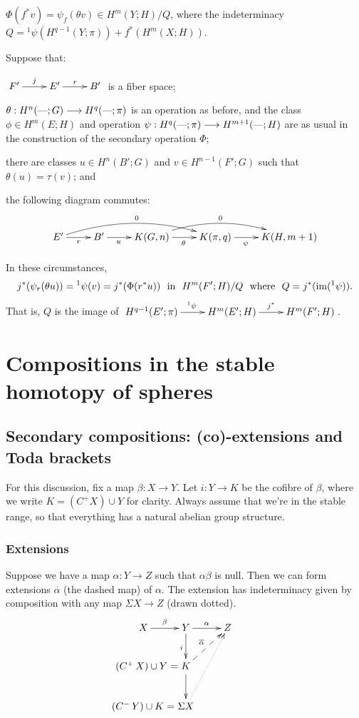 \documentclass[11pt]{article}
\begin{document}
\begin{thm*}
$\Phi(f^*v)=\psi_f(\theta v)\in H^m(Y;H)/Q$, where the indeterminacy 
$Q={^1\psi}(H^{q-1}(Y;\pi))+f^*(H^m(X;H))$.
\end{thm*}
Suppose that:
\begin{itemise}
\item $\xymatrix{F'\ar[r]^j&E'\ar[r]^r&B'}$ is a fiber space;
\item $\theta:H^n(\textup{---};G)\longrightarrow H^q(\textup{---};\pi)$ is an operation as before, and the
class $\phi\in H^m(E;H)$ and operation $\psi:H^q(\textup{---};\pi)\longrightarrow H^{m+1}(\textup{---};H)$
are as usual in the construction of the secondary operation $\Phi$;
\item there are classes $u\in H^n(B';G)$ and $v\in H^{n-1}(F';G)$ such that
$\theta(u)=\tau(v)$; and
\item the following diagram commutes:
\[\xymatrix{
E'\ar[r]_r\ar@/^1.2pc/[rrr]^0&
B'\ar[r]_{\ \ u\qquad}&
K(G,n)\ar[r]_\theta\ar@/^1.2pc/[rr]^0&
K(\pi,q)\ar[r]_{\psi\ \ \ \ }&
K(H,m+1)
}\]
\end{itemise}
\begin{thm*}In these circumstances,
\[j^*(\psi_r(\theta u))={^1\psi}(v)=j^*(\Phi(r^*u))\text{ \ in \ }
H^m(F';H)/Q\text{ \ where \ }Q=j^*(\operatorname{im}({^1\psi})).\]
That is, $Q$ is the image of 
$\xymatrix{H^{q-1}(E';\pi)\ar[r]^{^1\psi}&H^m(E';H)\ar[r]^{j^*}&H^m(F';H)}.$
\end{thm*}
\section{Compositions in the stable homotopy of spheres}
\subsection{Secondary compositions: (co)-extensions and Toda brackets}
For this discussion, fix a map $\beta:X\to Y$. Let $i:Y\to K$ be the cofibre of
$\beta$, where we write $K=(C^+\!X)\cup Y$ for clarity. Always assume that we're
in the stable range, so that everything has a natural abelian group structure.
\subsubsection*{Extensions}
Suppose we have a map $\alpha:Y\to Z$ such that $\alpha\beta$ is null. Then we
can form extensions $\overline\alpha$ (the dashed map) of $\alpha$. The
extension has indeterminacy given by composition with any map $\Sigma X\to Z$
(drawn dotted).
\[\xymatrix{
X\ar[r]^\beta&Y\ar[r]^\alpha\ar[d]_i&Z\\
&\makebox[0cm][r]{$(C^+\!\ X)\cup Y=$\ }K\ar@{-->}[ru]^{\overline\alpha}\ar[d]\\
&\makebox[0cm][r]{$(C^-\!\ Y)\cup K=$\ }\Sigma X\ar@{.>}[uur]
}\]
\end{document}
